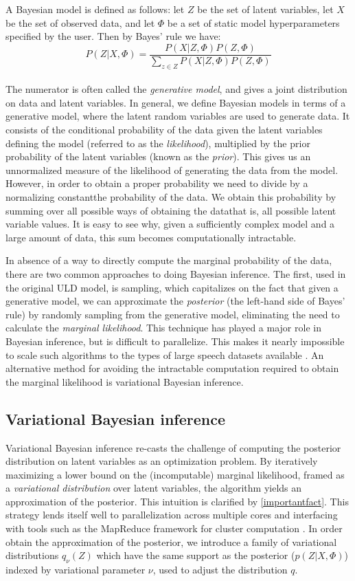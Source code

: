 \documentclass[12pt,letterpaper]{article}
\begin{document}
A Bayesian model is defined as follows: let $Z$ be the set of latent variables, let $X$ be the set of observed data, and let $\Phi$ be a set of static model hyperparameters specified by the user. Then by Bayes' rule we have: $$P(Z|X, \Phi) = \frac{P(X|Z, \Phi)P(Z, \Phi)}{\sum\limits_{ z \in Z} P(X|Z, \Phi)P(Z, \Phi)}$$\\ The numerator is often called the \textit{generative model}, and gives a joint distribution on data and latent variables. In general, we define Bayesian models in terms of a generative model, where the latent random variables are used to generate data. It consists of the conditional probability of the data given the latent variables defining the model (referred to as the \textit{likelihood}), multiplied by the prior probability of the latent variables (known as the \textit{prior}). This gives us an unnormalized measure of the likelihood of generating the data from the model. However, in order to obtain a proper probability we need to divide by a normalizing constant\textemdash the probability of the data. We obtain this probability by summing over all possible ways of obtaining the data\textemdash that is, all possible latent variable values. It is easy to see why, given a sufficiently complex model and a large amount of data, this sum becomes computationally intractable. 

In absence of a way to directly compute the marginal probability of the data, there are two common approaches to doing Bayesian inference. The first, used in the original ULD model, is sampling, which capitalizes on the fact that given a generative model, we can approximate the \textit{posterior} (the left-hand side of Bayes' rule) by randomly sampling from the generative model, eliminating the need to calculate the \textit{marginal likelihood}. This technique has played a major role in Bayesian inference, but is difficult to parallelize. This makes it nearly impossible to scale such algorithms to the types of large speech datasets available \citep{blei:2017}. An alternative method for avoiding the intractable computation required to obtain the marginal likelihood is variational Bayesian inference. 

\subsection{Variational Bayesian inference}
Variational Bayesian inference re-casts the challenge of computing the posterior distribution on latent variables as an optimization problem. By iteratively maximizing a lower bound on the (incomputable) marginal likelihood, framed as a \textit{variational distribution} over latent variables, the algorithm yields an approximation of the posterior. This intuition is clarified by \hyperref[importantfact]{\eqref{importantfact}}. This strategy lends itself well to parallelization across multiple cores and interfacing with tools such as the MapReduce framework for cluster computation \citep{zhai:2012}. In order obtain the approximation of the posterior, we introduce a family of variational distributions $q_{\nu}(Z)$ which have the same support as the posterior ($p(Z|X, \Phi)$) indexed by variational parameter $\nu$, used to adjust the distribution $q$. 
\end{document}
